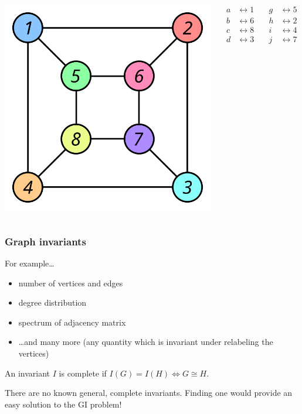 \documentclass{beamer}
\begin{document}
\begin{frame}
\begin{columns}[c]
    \centering
    \includegraphics[scale=0.36]{Graph_isomorphism_b}

    \centering
     {%
      \begin{align*}
        a &\leftrightarrow 1 &\quad g &\leftrightarrow 5 \\
        b &\leftrightarrow 6 &\quad h &\leftrightarrow 2 \\
        c &\leftrightarrow 8 &\quad i &\leftrightarrow 4 \\
        d &\leftrightarrow 3 &\quad j &\leftrightarrow 7
      \end{align*}
    }
  \end{columns}
\end{frame}

\begin{frame}
  \frametitle{Graph invariants}
  For example\ldots
  \begin{itemize}
    \item number of vertices and edges
    \item degree distribution
    \item spectrum of adjacency matrix
    \item \ldots and many more (any quantity which is invariant under
      relabeling the vertices)
  \end{itemize}
  \pause
  \begin{definition}
    An invariant $I$ is \alert{complete} if $I(G) = I(H) \iff G \cong H$.
  \end{definition}
  There are no known general, complete invariants. Finding one would provide an
  easy solution to the GI problem!
\end{frame}
\end{document}
